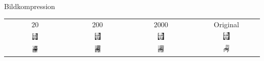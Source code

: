 \documentclass[10pt,aspectratio=169]{beamer}
\begin{document}
\begin{frame}[fragile]{Bildkompression}
	\begin{center}
	\begin{tabular}{cccc}
		$20$ & $200$ & $2000$ & Original \\
		\includegraphics[width=0.1\textwidth]{images/compression/mona_lisa_20} &
		\includegraphics[width=0.1\textwidth]{images/compression/mona_lisa_200} &
		\includegraphics[width=0.1\textwidth]{images/compression/mona_lisa_2000} & \includegraphics[width=0.1\textwidth]{images/compression/mona_lisa} \\
		\includegraphics[width=0.1\textwidth]{images/compression/chair_20} &
		\includegraphics[width=0.1\textwidth]{images/compression/chair_200} &
		\includegraphics[width=0.1\textwidth]{images/compression/chair_2000} & \includegraphics[width=0.1\textwidth]{images/compression/chair}
	\end{tabular}
	\end{center}
\end{frame}
\end{document}
